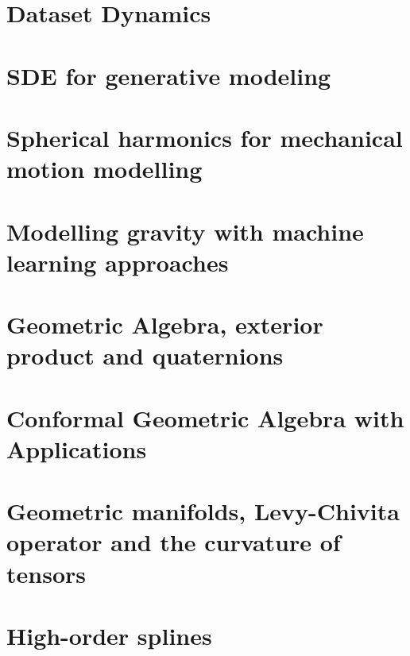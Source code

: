 \documentclass{mybook}
\begin{document}
    \clearpage
    \chapter{Dataset Dynamics}
    

    \clearpage
    \chapter{SDE for generative modeling}
    
    
    \clearpage
    \chapter{Spherical harmonics for mechanical motion modelling}
    
    
    \clearpage
    \chapter{Modelling gravity with machine learning approaches}
    
    
    \clearpage
    \chapter{Geometric Algebra, exterior product and quaternions}
    
    
    \clearpage
    \chapter{Conformal Geometric Algebra with Applications}
    
    
    \clearpage
    \chapter{ Geometric manifolds, Levy-Chivita operator and the curvature of tensors}
    
    
    \clearpage
    \chapter{High-order splines}
    


    \clearpage
    \printbibliography
\end{document}
